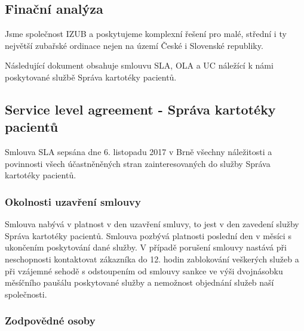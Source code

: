 \documentclass[11pt, a4paper, titlepage]{article}
\begin{document}
	
	\pagestyle{fancy}

	\begin{center}
		\section*{Finační analýza}
	\end{center}

	\noindent Jsme společnost IZUB a poskytujeme komplexní řešení pro malé, střední i ty největší zubařské ordinace nejen na území České i Slovenské republiky.

	\noindent Následující dokument obsahuje smlouvu SLA, OLA a UC náležící k námi poskytované službě Správa kartotéky pacientů.

	\noindent\makebox[\linewidth]{\rule{17.5cm}{0.4pt}}

	\vspace {1.5em}

	\subsection{Service level agreement - Správa kartotéky pacientů}

	Smlouva SLA sepsána dne 6. listopadu 2017 v Brně všechny náležitosti a povinnosti všech účastněněných stran zainteresovaných do služby Správa kartotéky pacientů.

	\subsubsection*{Okolnosti uzavření smlouvy}

	\noindent Smlouva nabývá v platnost v den uzavření smluvy, to jest v den zavedení služby Správa kartotéky pacientů. Smlouva pozbývá platnosti poslední den v měsíci s ukončením poskytování dané služby.
	\vspace {8pt}
	\noindent V případě porušení smlouvy nastává při neschopnosti kontaktovat zákazníka do 12. hodin zablokování veškerých služeb a při vzájemné sehodě s odstoupením od smlouvy sankce ve výši dvojnásobku měsíčního paušálu poskytované služby a nemožnost objednání služeb naší společnosti.

	\subsubsection*{Zodpovědné osoby}
\end{document}
